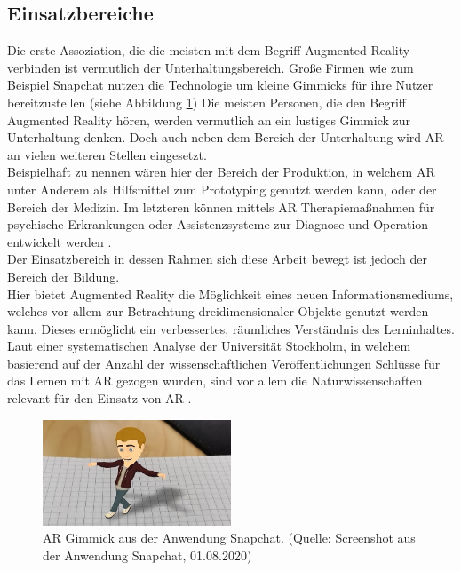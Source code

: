 \subsection{Einsatzbereiche}
Die erste Assoziation, die die meisten mit dem Begriff Augmented Reality verbinden ist vermutlich der Unterhaltungsbereich. Große Firmen wie zum Beispiel Snapchat nutzen die Technologie um kleine Gimmicks für ihre Nutzer bereitzustellen (siehe Abbildung \ref{fig:snapchat-ar})
Die meisten Personen, die den Begriff Augmented Reality hören, werden vermutlich an ein lustiges Gimmick zur Unterhaltung denken. Doch auch neben dem Bereich der Unterhaltung wird AR an vielen weiteren Stellen eingesetzt.\\
Beispielhaft zu nennen wären hier der Bereich der Produktion, in welchem AR unter Anderem als Hilfsmittel zum Prototyping \citep[S. 44]{tab:augmented-reality} genutzt werden kann, oder der Bereich der Medizin. Im letzteren können mittels AR Therapiemaßnahmen für psychische Erkrankungen oder Assistenzsysteme zur Diagnose und Operation entwickelt werden \citep[S. 52, 54]{tab:augmented-reality}.\\
Der Einsatzbereich in dessen Rahmen sich diese Arbeit bewegt ist jedoch der Bereich der Bildung.\\
Hier bietet Augmented Reality die Möglichkeit eines neuen Informationsmediums, welches vor allem zur Betrachtung dreidimensionaler Objekte genutzt werden kann. Dieses ermöglicht ein verbessertes, räumliches Verständnis des Lerninhaltes. 
Laut einer systematischen Analyse der Universität Stockholm, in welchem basierend auf der Anzahl der wissenschaftlichen Veröffentlichungen Schlüsse für das Lernen mit AR gezogen wurden, sind vor allem die Naturwissenschaften relevant für den Einsatz von AR  \citep[S. 81]{hedberg:review-ar-learning}. 

\begin{figure}[h!]
\centering
\includegraphics[width=0.5\textwidth]{Abbildungen/snapchat-ar.jpg}
\caption[Snapchat AR]{AR Gimmick aus der Anwendung Snapchat. (Quelle: Screenshot aus der Anwendung Snapchat, 01.08.2020)}
\label{fig:snapchat-ar}
\end{figure}

